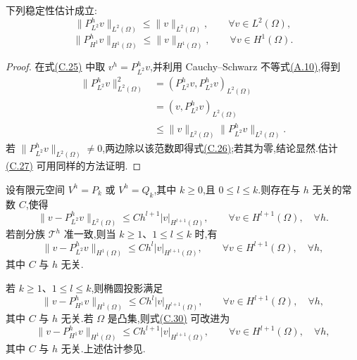 \begin{lemma}\label{lem:appendix-c-26}
下列稳定性估计成立:
\begin{equation}\label{eq:appendix-c-26}
 \|P^h_{L^2}v\|_{L^2(\Omega)}
 \le\|v\|_{L^2(\Omega)},
 \qquad \forall v\in L^2(\Omega),
\end{equation}
\begin{equation}\label{eq:appendix-c-27}
 \|P^h_{H^1}v\|_{H^1(\Omega)}
 \le\|v\|_{H^1(\Omega)},
 \qquad \forall v\in H^1(\Omega).
\end{equation}
\end{lemma}

\begin{proof}
在式\hyperref[eq:appendix-c-25]{(C.25)} 中取 $v^h=P^h_{L^2}v$,并利用 Cauchy--Schwarz 不等式\hyperref[eq:appendix-a-10]{(A.10)},得到
\[
\begin{aligned}
 \|P^h_{L^2}v\|_{L^2(\Omega)}^2
 &=(P^h_{L^2}v,P^h_{L^2}v)_{L^2(\Omega)}\\
 &=(v,P^h_{L^2}v)_{L^2(\Omega)}\\
 &\le\|v\|_{L^2(\Omega)}\|P^h_{L^2}v\|_{L^2(\Omega)}.
\end{aligned}
\]
若 $\|P^h_{L^2}v\|_{L^2(\Omega)}\ne0$,两边除以该范数即得式\hyperref[eq:appendix-c-26]{(C.26)};若其为零,结论显然.估计\hyperref[eq:appendix-c-27]{(C.27)} 可用同样的方法证明.
\end{proof}

\begin{theorem}[正交投影的误差估计]\label{thm:appendix-c-27}
设有限元空间 $V^h=P_k$ 或 $V^h=Q_k$,其中 $k\ge0$,且
$0\le l\le k$.则存在与 $h$ 无关的常数 $C$,使得
\begin{equation}\label{eq:appendix-c-28}
 \|v-P^h_{L^2}v\|_{L^2(\Omega)}
 \le Ch^{l+1}|v|_{H^{l+1}(\Omega)},
 \qquad \forall v\in H^{l+1}(\Omega),\quad \forall h.
\end{equation}
若剖分族 $\mathcal T^h$ 准一致,则当 $k\ge1$、$1\le l\le k$ 时,有
\begin{equation}\label{eq:appendix-c-29}
 \|v-P^h_{L^2}v\|_{H^1(\Omega)}
 \le Ch^l|v|_{H^{l+1}(\Omega)},
 \qquad \forall v\in H^{l+1}(\Omega),\quad \forall h,
\end{equation}
其中 $C$ 与 $h$ 无关.

若 $k\ge1$、$1\le l\le k$,则椭圆投影满足
\begin{equation}\label{eq:appendix-c-30}
 \|v-P^h_{H^1}v\|_{H^1(\Omega)}
 \le Ch^l|v|_{H^{l+1}(\Omega)},
 \qquad \forall v\in H^{l+1}(\Omega),\quad \forall h,
\end{equation}
其中 $C$ 与 $h$ 无关.若 $\Omega$ 是凸集,则式\hyperref[eq:appendix-c-30]{(C.30)} 可改进为
\begin{equation}\label{eq:appendix-c-31}
 \|v-P^h_{H^1}v\|_{H^1(\Omega)}
 \le Ch^{l+1}|v|_{H^{l+1}(\Omega)},
 \qquad \forall v\in H^{l+1}(\Omega),\quad \forall h,
\end{equation}
其中 $C$ 与 $h$ 无关.上述估计参见\textcite[命题 1.134 和 1.135]{ErnGuermond2004}.
\end{theorem}

